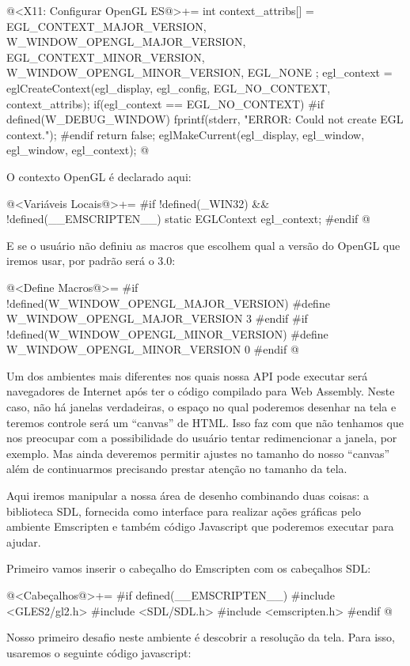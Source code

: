 \iniciocodigo
@<X11: Configurar OpenGL ES@>+=
{
  int context_attribs[] = {
    EGL_CONTEXT_MAJOR_VERSION, W_WINDOW_OPENGL_MAJOR_VERSION,
    EGL_CONTEXT_MINOR_VERSION, W_WINDOW_OPENGL_MINOR_VERSION,
    EGL_NONE
  };
  egl_context = eglCreateContext(egl_display, egl_config,
                                 EGL_NO_CONTEXT, context_attribs);
  if(egl_context == EGL_NO_CONTEXT){
#if defined(W_DEBUG_WINDOW)
    fprintf(stderr, "ERROR: Could not create EGL context.\n");
#endif
    return false;
  }
  eglMakeCurrent(egl_display, egl_window, egl_window, egl_context);
}
@
\fimcodigo

O contexto OpenGL é declarado aqui:

\iniciocodigo
@<Variáveis Locais@>+=
#if !defined(_WIN32) && !defined(__EMSCRIPTEN__)
static EGLContext egl_context;
#endif
@
\fimcodigo

E se o usuário não definiu as macros que escolhem qual a versão do
OpenGL que iremos usar, por padrão será o 3.0:

\iniciocodigo
@<Define Macros@>=
#if !defined(W_WINDOW_OPENGL_MAJOR_VERSION)
#define W_WINDOW_OPENGL_MAJOR_VERSION 3
#endif
#if !defined(W_WINDOW_OPENGL_MINOR_VERSION)
#define W_WINDOW_OPENGL_MINOR_VERSION 0
#endif
@
\fimcodigo



Um dos ambientes mais diferentes nos quais nossa API pode executar
será navegadores de Internet após ter o código compilado para Web
Assembly. Neste caso, não há janelas verdadeiras, o espaço no qual
poderemos desenhar na tela e teremos controle será um ``canvas'' de
HTML. Isso faz com que não tenhamos que nos preocupar com a
possibilidade do usuário tentar redimencionar a janela, por
exemplo. Mas ainda deveremos permitir ajustes no tamanho do nosso
``canvas'' além de continuarmos precisando prestar atenção no tamanho
da tela.

Aqui iremos manipular a nossa área de desenho combinando duas coisas:
a biblioteca SDL, fornecida como interface para realizar ações
gráficas pelo ambiente Emscripten e também código Javascript que
poderemos executar para ajudar.

Primeiro vamos inserir o cabeçalho do Emscripten com os cabeçalhos SDL:

\iniciocodigo
@<Cabeçalhos@>+=
#if defined(__EMSCRIPTEN__)
#include <GLES2/gl2.h>
#include <SDL/SDL.h>
#include <emscripten.h>
#endif
@
\fimcodigo

Nosso primeiro desafio neste ambiente é descobrir a resolução da
tela. Para isso, usaremos o seguinte código javascript:

